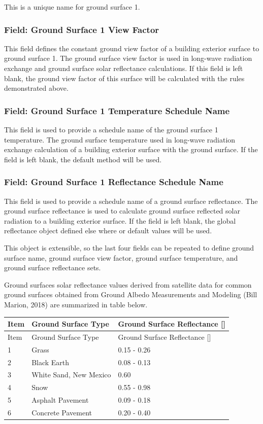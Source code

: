 This is a unique name for ground surface 1.

\subsubsection{Field: Ground Surface 1 View Factor}\label{field-ground-surface-1-view-factor}

This field defines the constant ground view factor of a building exterior surface to ground surface 1. The ground surface view factor is used in long-wave radiation exchange and ground surface solar reflectance calculations. If this field is left blank, the ground view factor of this surface will be calculated with the rules demonstrated above.

\subsubsection{Field: Ground Surface 1 Temperature Schedule Name}\label{field-ground-surface-1-temp-schedule-name}

This field is used to provide a schedule name of the ground surface 1 temperature. The ground surface temperature used in long-wave radiation exchange calculation of a building exterior surface with the ground surface. If the field is left blank, the default method will be used.

\subsubsection{Field: Ground Surface 1 Reflectance Schedule Name}\label{field-ground-surface-1-reflectance-schedule-name}

This field is used to provide a schedule name of a ground surface reflectance. The ground surface reflectance is used to calculate ground surface reflected solar radiation to a building exterior surface. If the field is left blank, the global reflectance object defined else where or default values will be used.

This object is extensible, so the last four fields can be repeated to define ground surface name, ground surface view factor, ground surface temperature, and ground surface reflectance sets.

Ground surfaces solar reflectance values derived from satellite data for common ground surfaces obtained from Ground Albedo Measurements and Modeling (Bill Marion, 2018) are summarized in table below.

\begin{longtable}[c]{p{1.0in}p{2.5in}p{2.5in}}
\toprule
Item & Ground Surface Type & Ground Surface Reflectance [] \tabularnewline
\midrule
\endfirsthead

\toprule
Item & Ground Surface Type & Ground Surface Reflectance [] \tabularnewline
\midrule
\endhead

1 & Grass & 0.15  -  0.26 \tabularnewline
2 & Black Earth & 0.08  -  0.13 \tabularnewline
3 & White Sand, New Mexico & 0.60 \tabularnewline
4 & Snow & 0.55  -  0.98 \tabularnewline
5 & Asphalt Pavement & 0.09  -  0.18 \tabularnewline
6 & Concrete Pavement & 0.20  -  0.40 \tabularnewline

\bottomrule
\end{longtable}


